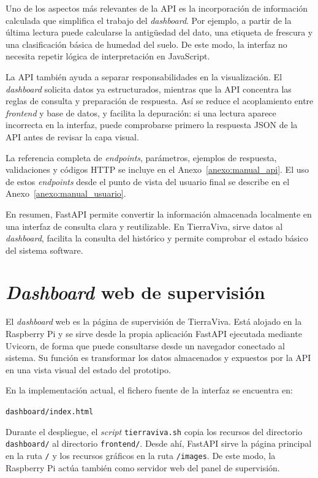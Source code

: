 Uno de los aspectos más relevantes de la API es la incorporación de información calculada que simplifica el trabajo del \textit{dashboard}. Por ejemplo, a partir de la última lectura puede calcularse la antigüedad del dato, una etiqueta de frescura y una clasificación básica de humedad del suelo. De este modo, la interfaz no necesita repetir lógica de interpretación en JavaScript.

La API también ayuda a separar responsabilidades en la visualización. El \textit{dashboard} solicita datos ya estructurados, mientras que la API concentra las reglas de consulta y preparación de respuesta. Así se reduce el acoplamiento entre \textit{frontend} y base de datos, y facilita la depuración: si una lectura aparece incorrecta en la interfaz, puede comprobarse primero la respuesta JSON de la API antes de revisar la capa visual.

La referencia completa de \textit{endpoints}, parámetros, ejemplos de respuesta, validaciones y códigos HTTP se incluye en el Anexo~\ref{anexo:manual_api}. El uso de estos \textit{endpoints} desde el punto de vista del usuario final se describe en el Anexo~\ref{anexo:manual_usuario}.

En resumen, FastAPI permite convertir la información almacenada localmente en una interfaz de consulta clara y reutilizable. En TierraViva, sirve datos al \textit{dashboard}, facilita la consulta del histórico y permite comprobar el estado básico del sistema software.

\section{\textit{Dashboard} web de supervisión}
\label{sec:dashboard_web_supervision}

El \textit{dashboard} web es la página de supervisión de TierraViva. Está alojado en la Raspberry Pi y se sirve desde la propia aplicación FastAPI ejecutada mediante Uvicorn, de forma que puede consultarse desde un navegador conectado al sistema. Su función es transformar los datos almacenados y expuestos por la API en una vista visual del estado del prototipo.

En la implementación actual, el fichero fuente de la interfaz se encuentra en:

\begin{center}
\texttt{dashboard/index.html}
\end{center}

Durante el despliegue, el \textit{script} \texttt{tierraviva.sh} copia los recursos del directorio \texttt{dashboard/} al directorio \texttt{frontend/}. Desde ahí, FastAPI sirve la página principal en la ruta \texttt{/} y los recursos gráficos en la ruta \texttt{/images}. De este modo, la Raspberry Pi actúa también como servidor web del panel de supervisión.

